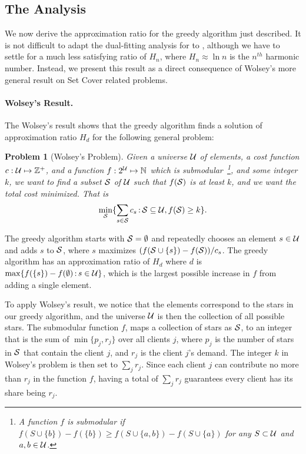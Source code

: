 \documentclass[oneside,final]{ucr}
\newtheorem{problem}[theorem]{Problem}
\begin{document}
\subsection{The Analysis}
We now derive the approximation ratio for the greedy
algorithm just described. It is not difficult to adapt the
dual-fitting analysis for {\UFL} to {\FTFP}, although we
have to settle for a much less satisfying ratio of $H_n$,
where $H_n\approx \ln n$ is the $n^{th}$ harmonic
number. Instead, we present this result as a direct
consequence of Wolsey's more general result on Set Cover
related problems.

\paragraph{Wolsey's Result.}
The Wolsey's result shows that the greedy algorithm finds a
solution of approximation ratio $H_d$ for the following
general problem:

\begin{problem}[Wolsey's Problem]
  Given a universe $\calU$ of elements, a cost function $c:
  \calU \mapsto \mathbb{Z}^+$, and a function $f : 2^\calU
  \mapsto \mathbb{N}$ which is submodular~\footnote{A
    function $f$ is submodular if $f(S \cup \{b\}) -
    f(\{b\}) \geq f(S \cup \{a,b\}) - f (S \cup \{a\})$ for
    any $S \subset \calU$ and $a, b \in \calU$.}, and some
  integer $k$, we want to find a subset $\calS$ of $\calU$
  such that $f(\calS)$ is at least $k$, and we want the
  total cost minimized. That is
\begin{equation*}
  \min_{\calS} \{ \sum_{s\in\calS} c_s \suchthat
  \calS\subseteq \calU, f(\calS) \geq k\}.
\end{equation*}
\end{problem}

The greedy algorithm starts with $\calS = \emptyset$ and
repeatedly chooses an element $s \in \calU$ and adds $s$ to
$\calS$, where $s$ maximizes $(f(\calS \cup \{s\}) -
f(\calS)) / c_s$. The greedy algorithm has an approximation
ratio of $H_d$ where $d$ is $\max\{f(\{s\}) - f(\emptyset)
\suchthat s \in \calU\}$, which is the largest possible
increase in $f$ from adding a single element.

To apply Wolsey's result, we notice that the elements
correspond to the stars in our greedy algorithm, and the
universe $\calU$ is then the collection of all possible
stars. The submodular function $f$, maps a collection of
stars as $\calS$, to an integer that is the sum of
$\min\{p_j, r_j\}$ over all clients $j$, where $p_j$ is the
number of stars in $\calS$ that contain the client $j$, and
$r_j$ is the client $j$'s demand. The integer $k$ in
Wolsey's problem is then set to $\sum_{j} r_j$. Since each
client $j$ can contribute no more than $r_j$ in the function
$f$, having a total of $\sum_j r_j$ guarantees every client
has its share being $r_j$.
\end{document}
